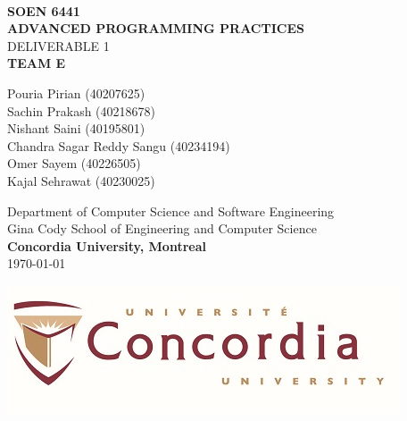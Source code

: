 \documentclass{report}
\begin{document}
\begin{titlepage}
  \begin{center}
    \textbf{\Large\\ SOEN 6441}
    \vspace{1cm}
    \textbf{\Huge\\ ADVANCED PROGRAMMING PRACTICES}
    \vspace{1cm}
    \Huge\\DELIVERABLE 1\\
    \vspace{1cm}
    \Large \textbf{TEAM E}\\
    \begin{large}
      \vspace{.5cm}
      Pouria Pirian (40207625)\\
      Sachin Prakash (40218678)\\
      Nishant	Saini (40195801)\\
      Chandra Sagar Reddy	Sangu (40234194)\\
      Omer Sayem (40226505)\\
      Kajal Sehrawat (40230025)\\
    \end{large}
    \begin{Large}
      
      \vspace{1 cm}
      Department of Computer Science and Software Engineering \\
      Gina Cody School of Engineering and Computer Science \\
      \textbf{Concordia University, Montreal}\\

      \vspace{1 cm}
      \today \\
    \end{Large}
  \end{center}

  \vfill
  \begin{center}
    \includegraphics[width = 50ex]{resources/concordia_med.jpg}
  \end{center}
  
\end{titlepage}
\end{document}

